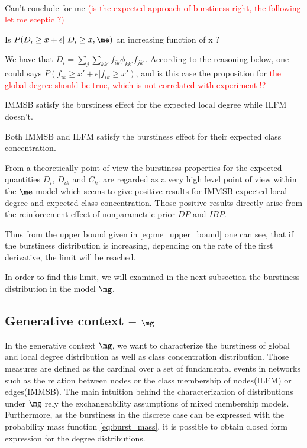 \begin{proposition}~\\
    Can't conclude for me \textcolor{red}{(is the expected approach of burstiness right, the following let me sceptic ?)}

    Is $P(D_i \geq x +\epsilon | D_i \geq x, \me)$ an increasing function of x ? 

    We have that $D_i = \sum_j \sum_{kk'} f_{ik} \phi_{kk'} f_{jk'}$.  According to the reasoning below, one could says $P(f_{ik} \geq x' + \epsilon | f_{ik} \geq x')$, and is this case the proposition for \textcolor{red}{the global degree should be true, which is not correlated with experiment !? }
\end{proposition}

\begin{proposition}\label{th:ldegree_exp_me}
    IMMSB satisfy the burstiness effect for the  expected local degree while ILFM doesn't.
\end{proposition}

\begin{proposition}\label{th:feature_exp_me}
    Both IMMSB and ILFM satisfy the burstiness effect for their expected class concentration.
\end{proposition}


From a theoretically point of view the burstiness properties for the expected quantities $D_i$, $D_{ik}$ and $C_k$. are regarded as a very high level point of view within the $\me$ model which seems to give positive results for IMMSB expected local degree and expected class concentration. Those positive results directly arise from the reinforcement effect of nonparametric prior $DP$ and $IBP$.


Thus from the upper bound given in \eqref{eq:me_upper_bound} one can see, that if the burstiness distribution is increasing,  depending on the rate of the first derivative, the limit will be reached.

In order to find this limit, we will examined in the next subsection the burstiness distribution in the model $\mg$.

\subsection{Generative context -- $\mg$}

In the generative context $\mg$, we want to characterize the burstiness of global and local degree distribution as well as class concentration distribution. Those measures are defined as the cardinal over a set of fundamental events in networks such as the relation between nodes or the class membership of nodes(ILFM) or edges(IMMSB). The main intuition behind the characterization of distributions under $\mg$ rely the exchangeability assumptions of mixed membership models. Furthermore, as the burstiness in the discrete case can be expressed with the probability mass function \ref{eq:burst_mass}, it is possible to obtain closed form expression for the degree distributions.~\\


